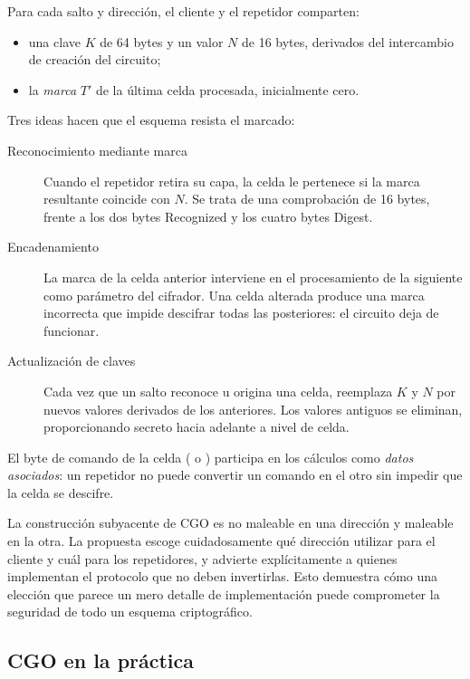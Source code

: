 Para cada salto y dirección, el cliente y el repetidor comparten:
\begin{itemize}
  \item una clave $K$ de 64 bytes y un valor $N$ de 16 bytes, derivados del intercambio de creación del circuito;
  \item la \emph{marca} $T'$ de la última celda procesada, inicialmente cero.
\end{itemize}

Tres ideas hacen que el esquema resista el marcado:
\begin{description}
  \item[Reconocimiento mediante marca] Cuando el repetidor retira su capa, la celda le pertenece si la marca resultante coincide con $N$. Se trata de una comprobación de 16 bytes, frente a los dos bytes Recognized y los cuatro bytes Digest.
  \item[Encadenamiento] La marca de la celda anterior interviene en el procesamiento de la siguiente como parámetro del cifrador. Una celda alterada produce una marca incorrecta que impide descifrar todas las posteriores: el circuito deja de funcionar.
  \item[Actualización de claves] Cada vez que un salto reconoce u origina una celda, reemplaza $K$ y $N$ por nuevos valores derivados de los anteriores. Los valores antiguos se eliminan, proporcionando secreto hacia adelante a nivel de celda.
\end{description}

El byte de comando de la celda ( o ) participa en los cálculos como \emph{datos asociados}: un repetidor no puede convertir un comando en el otro sin impedir que la celda se descifre.

\begin{attenzione}
La construcción subyacente de CGO es no maleable en una dirección y maleable en la otra. La propuesta escoge cuidadosamente qué dirección utilizar para el cliente y cuál para los repetidores, y advierte explícitamente a quienes implementan el protocolo que no deben invertirlas. Esto demuestra cómo una elección que parece un mero detalle de implementación puede comprometer la seguridad de todo un esquema criptográfico.
\end{attenzione}

\subsection{CGO en la práctica}

